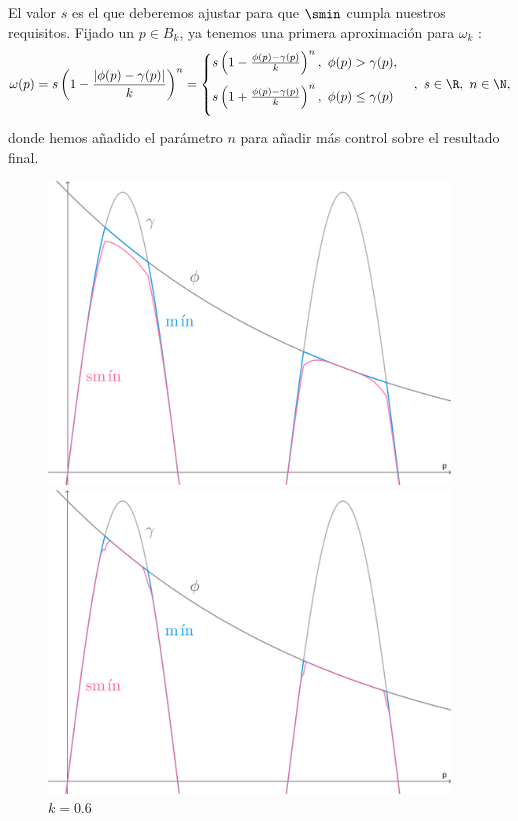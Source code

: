 El valor $s$ es el que deberemos ajustar para que $\smin$ cumpla nuestros requisitos. Fijado un $p\in B_{k}$, ya tenemos una primera aproximación para $\omega_k$ :
\begin{equation*}
    \omega(p) = s\left( 1-\frac{|\phi(p)-\gamma(p)|}{k} \right)^n = \begin{cases}
        s\left( 1-\frac{\phi(p)-\gamma(p)}{k}\right)^n,\ \phi(p)>\gamma(p), \\[10pt]
        s\left( 1+\frac{\phi(p)-\gamma(p)}{k}\right)^n,\ \phi(p)\le \gamma(p)\\[10pt]
    \end{cases}  ,\ s\in\R,\ n\in\N,
\end{equation*}
donde hemos añadido el parámetro $n$ para añadir más control sobre el resultado final.\newline 
\begin{figure}[!h]
     \begin{minipage}[c]{0.49\linewidth}
        \centering
        \includegraphics[width=0.95\textwidth]{Plantilla-TFG-master/img/smin_1.png}
        \caption{$k=0.6$}
     \end{minipage}
     \begin{minipage}[c]{0.49\linewidth}
        \centering
        \includegraphics[width=0.95\textwidth]{Plantilla-TFG-master/img/smin_2.png}

\end{minipage}
\end{figure}
